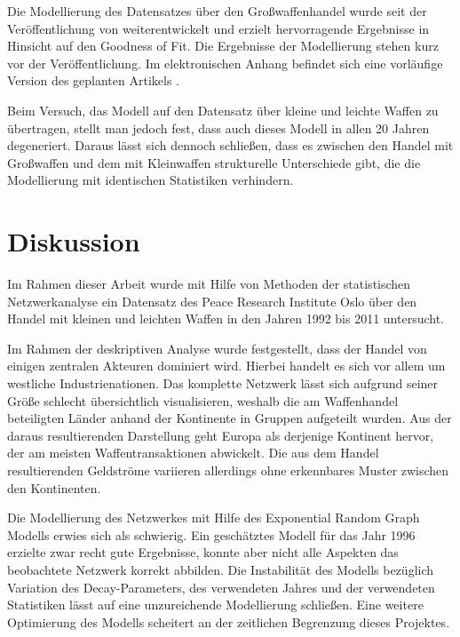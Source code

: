 \documentclass[a4paper,ngerman,oneside,titlepage,bibliography=totoc,11pt]{scrreprt}
\begin{document}
Die Modellierung des Datensatzes über den Großwaffenhandel wurde seit der Veröffentlichung von \citet{js14} weiterentwickelt und erzielt hervorragende Ergebnisse in Hinsicht auf den Goodness of Fit. Die Ergebnisse der Modellierung stehen kurz vor der Veröffentlichung. Im elektronischen Anhang befindet sich eine vorläufige Version des geplanten Artikels \citep{armstransfer}.

Beim Versuch, das Modell auf den Datensatz über kleine und leichte Waffen zu übertragen, stellt man jedoch fest, dass auch dieses Modell in allen 20 Jahren degeneriert. Daraus lässt sich dennoch schließen, dass es zwischen den Handel mit Großwaffen und dem mit Kleinwaffen strukturelle Unterschiede gibt, die die Modellierung mit identischen Statistiken verhindern.

\chapter{Diskussion}

Im Rahmen dieser Arbeit wurde mit Hilfe von Methoden der statistischen Netzwerkanalyse ein Datensatz des Peace Research Institute Oslo über den Handel mit kleinen und leichten Waffen in den Jahren 1992 bis 2011 untersucht.

Im Rahmen der deskriptiven Analyse wurde festgestellt, dass der Handel von einigen zentralen Akteuren dominiert wird. Hierbei handelt es sich vor allem um westliche Industrienationen. Das komplette Netzwerk lässt sich aufgrund seiner Größe schlecht übersichtlich visualisieren, weshalb die am Waffenhandel beteiligten Länder anhand der Kontinente in Gruppen aufgeteilt wurden. Aus der daraus resultierenden Darstellung geht Europa als derjenige Kontinent hervor, der am meisten Waffentransaktionen abwickelt. Die aus dem Handel resultierenden Geldströme variieren allerdings ohne erkennbares Muster zwischen den Kontinenten.

Die Modellierung des Netzwerkes mit Hilfe des Exponential Random Graph Modells erwies sich als schwierig. Ein geschätztes Modell für das Jahr 1996 erzielte zwar recht gute Ergebnisse, konnte aber nicht alle Aspekten das beobachtete Netzwerk korrekt abbilden. Die Instabilität des Modells bezüglich Variation des Decay-Parameters, des verwendeten Jahres und der verwendeten Statistiken lässt auf eine unzureichende Modellierung schließen. Eine weitere Optimierung des Modells scheitert an der zeitlichen Begrenzung dieses Projektes.
\end{document}
